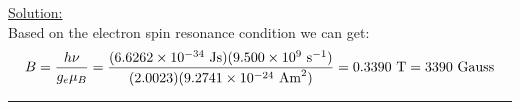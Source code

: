 \noindent
\underline{Solution:}\\

\noindent
Based on the electron spin resonance condition we can get:
$$B = \frac{h\nu}{g_e\mu_B} = \frac{(6.6262\times 10^{-34}\textnormal{ Js})(9.500\times 10^9\textnormal{ s}^{-1})}{(2.0023)(9.2741\times 10^{-24}\textnormal{ Am}^2)} = 0.3390\textnormal{ T} = 3390\textnormal{ Gauss}$$
\hrule\vspace{0.5cm}

